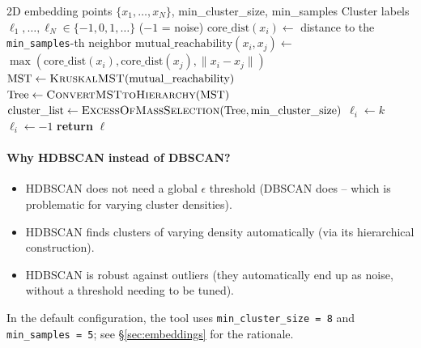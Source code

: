 \documentclass[11pt,a4paper,twoside]{article}
\theoremstyle{remark}
\begin{document}
\begin{algorithm}[H]
\caption{\textsc{HDBSCANCluster}}
\begin{algorithmic}[1]
\Require 2D embedding points $\{x_1, \ldots, x_N\}$,
         min\_cluster\_size, min\_samples
\Ensure Cluster labels $\ell_1, \ldots, \ell_N \in \{-1, 0, 1, \ldots\}$
       ($-1$ = noise)
\State {}
\State $\text{core\_dist}(x_i) \gets$ distance to the
       \texttt{min\_samples}-th neighbor
\State $\text{mutual\_reachability}(x_i, x_j) \gets$
       $\max(\text{core\_dist}(x_i), \text{core\_dist}(x_j),
       \|x_i - x_j\|)$
\State {}
\State $\text{MST} \gets \textsc{KruskalMST}(\text{mutual\_reachability})$
\State {}
\State $\text{Tree} \gets \textsc{ConvertMSTtoHierarchy}(\text{MST})$
\State {}
\State $\text{cluster\_list} \gets \textsc{ExcessOfMassSelection}(\text{Tree},
       \text{min\_cluster\_size})$
\State {}
    \State $\ell_i \gets k$
  \Else
    \State $\ell_i \gets -1$  
  \EndIf
\EndFor
\State \textbf{return} $\boldsymbol{\ell}$
\end{algorithmic}
\end{algorithm}

\paragraph{Why HDBSCAN instead of DBSCAN?}
\begin{itemize}\setlength{\itemsep}{0pt}
  \item HDBSCAN does not need a global $\epsilon$ threshold (DBSCAN
        does -- which is problematic for varying cluster
        densities).
  \item HDBSCAN finds clusters of varying density automatically
        (via its hierarchical construction).
  \item HDBSCAN is robust against outliers (they automatically end
        up as noise, without a threshold needing to be tuned).
\end{itemize}

In the default configuration, the tool uses
\texttt{min\_cluster\_size = 8} and \texttt{min\_samples = 5}; see
\S\ref{sec:embeddings} for the rationale.
\end{document}

